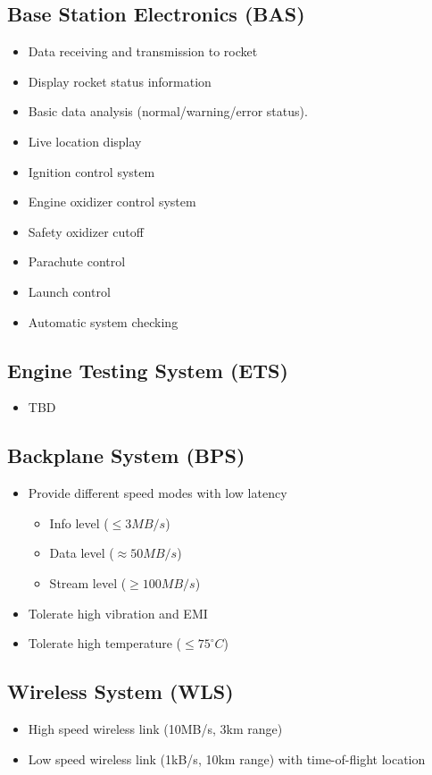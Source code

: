 \documentclass[12pt,article]{memoir}
\begin{document}
\subsection{Base Station Electronics (BAS)}
\begin{itemize}
\item Data receiving and transmission to rocket
\item Display rocket status information 
\item Basic data analysis (normal/warning/error status).
\item Live location display
\item Ignition control system
\item Engine oxidizer control system
\item Safety oxidizer cutoff
\item Parachute control
\item Launch control
\item Automatic system checking
\end{itemize}
\subsection{Engine Testing System (ETS)}
\begin{itemize}
\item TBD
\end{itemize}
\subsection{Backplane System (BPS)}
\begin{itemize}
\item Provide different speed modes with low latency
\begin{itemize}
\item Info level ($\leq 3MB/s$)
\item Data level ($\approx 50MB/s$)
\item Stream level ($\geq 100MB/s$)
\end{itemize}
\item Tolerate high vibration and EMI
\item Tolerate high temperature ($\leq 75^{\circ}C$)
\end{itemize}
\subsection{Wireless System (WLS)}
\begin{itemize}
\item High speed wireless link (10MB/s, 3km range)
\item Low speed wireless link (1kB/s, 10km range) with time-of-flight location
\end{itemize}
\end{document}
